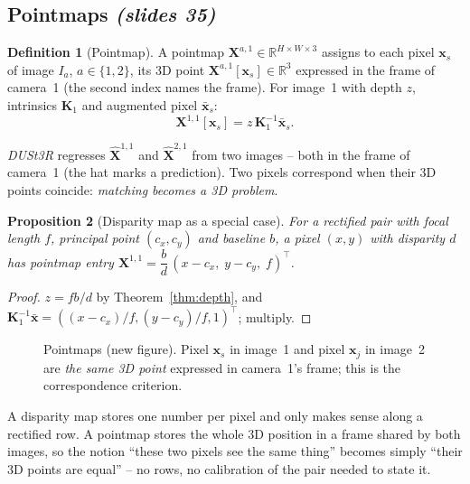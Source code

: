 \documentclass[11pt,a4paper]{article}
\newcommand{\slr}[1]{\texorpdfstring{\emph{(slides #1)}}{(slides #1)}}
\newcommand{\K}{\mathbf{K}}
\newcommand{\vx}{\bm{x}}
\newcommand{\xb}{\bar{\bm{x}}}
\newcommand{\Xhat}{\hat{\bm{X}}}
\theoremstyle{definition}
\newtheorem{definition}{Definition}[section]
\theoremstyle{plain}
\newtheorem{proposition}[definition]{Proposition}
\theoremstyle{remark}
\begin{document}
\subsection{Pointmaps \slr{35}}
\begin{definition}[Pointmap]
A pointmap $\bm X^{a,1}\in\mathbb R^{H\times W\times3}$ assigns to each pixel $\vx_s$ of image $I_a$, $a\in\{1,2\}$, its 3D point $\bm X^{a,1}[\vx_s]\in\mathbb R^3$ expressed in the frame of camera~1 (the second index names the frame). For image~1 with depth $z$, intrinsics $\K_1$ and augmented pixel $\xb_s$:
\[ \bm X^{1,1}[\vx_s]=z\,\K_1^{-1}\xb_s. \]
\end{definition}
\emph{DUSt3R} regresses $\Xhat^{1,1}$ and $\Xhat^{2,1}$ from two images -- both in the frame of camera~1 (the hat marks a prediction). Two pixels correspond when their 3D points coincide: \emph{matching becomes a 3D problem}.
\begin{proposition}[Disparity map as a special case]
For a rectified pair with focal length $f$, principal point $(c_x,c_y)$ and baseline $b$, a pixel $(x,y)$ with disparity $d$ has pointmap entry $\bm X^{1,1}=\dfrac{b}{d}\,(x-c_x,\;y-c_y,\;f)^{\top}$.
\end{proposition}
\begin{proof}
$z=fb/d$ by Theorem~\ref{thm:depth}, and $\K_1^{-1}\xb=((x-c_x)/f,(y-c_y)/f,1)^{\top}$; multiply.
\end{proof}
\begin{figure}[H]\centering
{}
\caption{Pointmaps (new figure). Pixel $\vx_s$ in image~1 and pixel $\vx_j$ in image~2 are \emph{the same 3D point} expressed in camera~1's frame; this is the correspondence criterion.}
\end{figure}
\begin{intuition}
A disparity map stores one number per pixel and only makes sense along a rectified row. A pointmap stores the whole 3D position in a frame shared by both images, so the notion ``these two pixels see the same thing'' becomes simply ``their 3D points are equal'' -- no rows, no calibration of the pair needed to state it.
\end{intuition}
\end{document}
